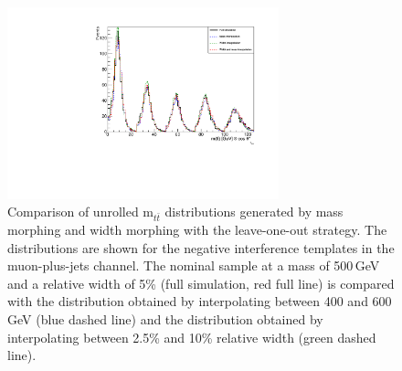 \begin{figure}[!Hhtb]
\centering
\includegraphics[width=0.7\textwidth,keepaspectratio=true]{fig/chapt8/morphing/mass_morph_mujets_neg-int-5pc-M500.pdf}
\caption{Comparison of unrolled m$_{t\bar t}$ distributions generated by mass morphing and width morphing with the leave-one-out strategy. The distributions are shown for the negative interference templates in the muon-plus-jets channel. The nominal sample at a mass of 500\,GeV and a relative width of 5\% (full simulation, red full line) is compared with the distribution obtained by interpolating between 400 and 600\,GeV (blue dashed line) and the distribution obtained by interpolating between 2.5\% and 10\% relative width (green dashed line).}
\label{fig:morph_mass_mu_negint_500_5}
\end{figure}


